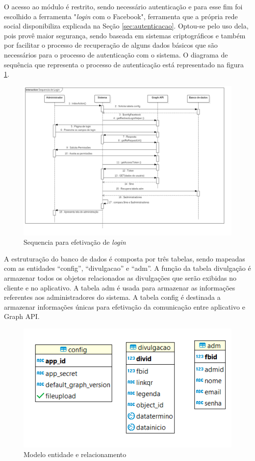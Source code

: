 O acesso ao módulo é restrito, sendo necessário autenticação e para esse fim foi escolhido a ferramenta "\textit{login} com o Facebook", ferramenta que a própria rede social disponibiliza explicada na Seção \ref{sec:autenticacao}. Optou-se pelo uso dela, pois provê maior segurança, sendo baseada em sistemas criptográficos e também por facilitar o processo de recuperação de alguns dados básicos que são necessários para o processo de autenticação com o sistema. O diagrama de sequência que representa o processo de autenticação está representado na figura \ref{fig:sequencialogin}.

\begin{figure}[H]
\centering
\includegraphics[scale=0.4]{figuras/sequencialogin}
\caption{Sequencia para efetivação de \textit{login}}
\label{fig:sequencialogin}
\end{figure}

A estruturação do banco de dados é composta por três tabelas, sendo mapeadas com as entidades ``config'', ``divulgacao'' e ``adm''. A função da tabela divulgação é armazenar todos os objetos relacionados as divulgações que serão exibidas no cliente e no aplicativo. A tabela adm é usada para armazenar as informações referentes aos administradores do sistema. A tabela config é destinada a armazenar informações únicas para efetivação da comunicação entre aplicativo e Graph API.

\begin{figure}[H]
\centering
\includegraphics[scale=1]{figuras/entidaderelacionamento}
\caption{Modelo entidade e relacionamento}
\label{fig:casosDeUso}
\end{figure}

